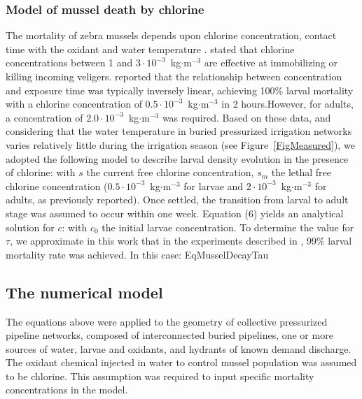 \documentclass[review,authoryear]{elsarticle}
\begin{document}
\subsubsection{Model of mussel death by chlorine\label{SecMusselDeath}}

The mortality of zebra mussels depends upon chlorine concentration, contact time
with the oxidant and water temperature \citep{vanBenschoten95}.
\citet{MackieClaudi10} stated that chlorine concentrations between 1 and
$3\cdot10^{-3}$~kg$\cdot$m$^{-3}$ are effective at immobilizing or killing
incoming veligers.  \citet{SprecherGetsinger00} reported that the relationship
between concentration and exposure time was typically inversely linear,
achieving 100\% larval mortality with a chlorine concentration of
$0.5\cdot10^{-3}$~kg$\cdot$m$^{-3}$ in 2 hours.However, for adults,
a concentration of $2.0\cdot10^{-3}$~kg$\cdot$m$^{-3}$ was required.
Based on these data, and considering that the water temperature in buried
pressurized irrigation networks varies relatively little during the irrigation
season (see Figure~\ref{FigMeasured}), we adopted the following model to
describe larval density evolution in the presence of chlorine:
with $s$ the current free chlorine concentration, $s_m$ the lethal free
chlorine concentration ($0.5\cdot10^{-3}$~kg$\cdot$m$^{-3}$ for larvae and
$2\cdot10^{-3}$~kg$\cdot$m$^{-3}$ for adults, as previously reported).
Once settled, the transition from larval to adult stage was assumed to occur
within one week. Equation (6) yields an analytical solution for $c$:
with $c_0$ the initial larvae concentration. To determine the value for $\tau$,
we approximate in this work that in the experiments described in
\cite{SprecherGetsinger00}, 99\% larval mortality rate was achieved. In this
case:
{EqMusselDecayTau}

\subsection{The numerical model}

The equations above were applied to the geometry of collective pressurized
pipeline networks, composed of interconnected buried pipelines, one or more
sources of water, larvae and oxidants, and hydrants of known demand discharge.
The oxidant chemical injected in water to control mussel population was assumed
to be chlorine. This assumption was required to input specific mortality
concentrations in the model.
\end{document}
